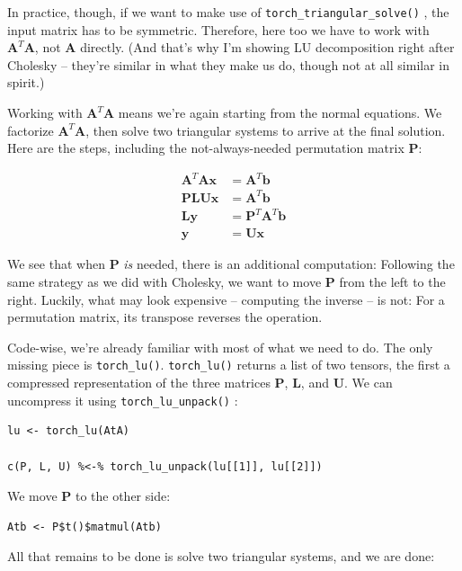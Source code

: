 \documentclass[
  letterpaper,
]{krantz}
\begin{document}
In practice, though, if we want to make use of
\texttt{torch\_triangular\_solve()} , the input matrix has to be
symmetric. Therefore, here too we have to work with
\(\mathbf{A}^T\mathbf{A}\), not \(\mathbf{A}\) directly. (And that's why
I'm showing LU decomposition right after Cholesky -- they're similar in
what they make us do, though not at all similar in spirit.)

Working with \(\mathbf{A}^T\mathbf{A}\) means we're again starting from
the normal equations. We factorize \(\mathbf{A}^T\mathbf{A}\), then
solve two triangular systems to arrive at the final solution. Here are
the steps, including the not-always-needed permutation matrix
\(\mathbf{P}\):

\[
\begin{aligned}
\mathbf{A}^T \mathbf{A} \mathbf{x} &= \mathbf{A}^T \mathbf{b} \\
\mathbf{P} \mathbf{L}\mathbf{U} \mathbf{x} &= \mathbf{A}^T \mathbf{b} \\
\mathbf{L} \mathbf{y} &= \mathbf{P}^T \mathbf{A}^T \mathbf{b} \\
\mathbf{y} &= \mathbf{U} \mathbf{x}
\end{aligned}
\]

We see that when \(\mathbf{P}\) \emph{is} needed, there is an additional
computation: Following the same strategy as we did with Cholesky, we
want to move \(\mathbf{P}\) from the left to the right. Luckily, what
may look expensive -- computing the inverse -- is not: For a permutation
matrix, its transpose reverses the operation.

Code-wise, we're already familiar with most of what we need to do. The
only missing piece is
\texttt{torch\_lu()}.
\texttt{torch\_lu()} returns a list of two tensors, the first a
compressed representation of the three matrices \(\mathbf{P}\),
\(\mathbf{L}\), and \(\mathbf{U}\). We can uncompress it using
\texttt{torch\_lu\_unpack()} :

\begin{verbatim}
lu <- torch_lu(AtA)

c(P, L, U) %<-% torch_lu_unpack(lu[[1]], lu[[2]]) 
\end{verbatim}

We move \(\mathbf{P}\) to the other side:

\begin{verbatim}
Atb <- P$t()$matmul(Atb)
\end{verbatim}

All that remains to be done is solve two triangular systems, and we are
done:
\end{document}
